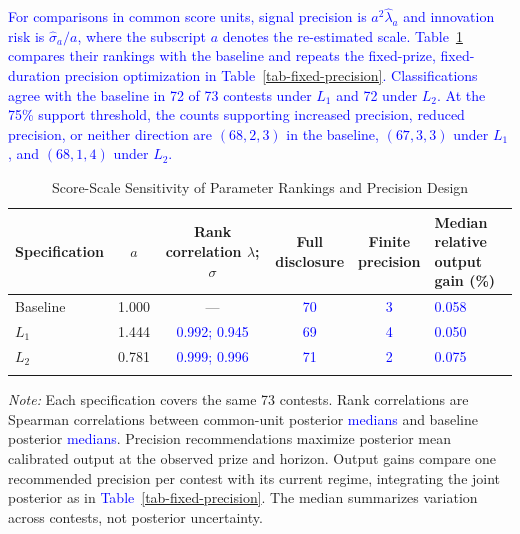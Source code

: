 \documentclass[mnsc]{informs3}
\begin{document}
\begin{APPENDICES}
\textcolor{blue}{For comparisons in common score units, signal precision is $a^2\hat\lambda_a$ and innovation risk is $\hat\sigma_a/a$, where the subscript $a$ denotes the re-estimated scale. Table~\ref{tab-score-scale-robustness} compares their rankings with the baseline and repeats the \textcolor{blue}{fixed-prize, fixed-duration precision optimization in Table~\ref{tab-fixed-precision}}. Classifications agree with the baseline in 72 of 73 contests under $L_1$ and 72 under $L_2$. At the 75\% support threshold, the counts supporting increased precision, reduced precision, or neither direction are $(68,2,3)$ in the baseline, $(67,3,3)$ under $L_1$, and $(68,1,4)$ under $L_2$.}

\begin{table}[htbp]
\centering
\caption{{Score-Scale Sensitivity of Parameter Rankings and Precision Design}}
\label{tab-score-scale-robustness}
{\small
\begin{tabularx}{\textwidth}{lcccc>{\centering\arraybackslash}X}
\toprule
Specification & $a$ & \makecell{Rank correlation\\$\lambda$; $\sigma$}
& \makecell{Full\\disclosure} & \makecell{Finite\\precision}
& \makecell{Median relative\\output gain (\%)}\\
\midrule
Baseline & 1.000 & --- & \textcolor{blue}{70} & \textcolor{blue}{3} & \textcolor{blue}{0.058}\\
$L_1$ & 1.444 & \textcolor{blue}{0.992; 0.945} & \textcolor{blue}{69} & \textcolor{blue}{4} & \textcolor{blue}{0.050}\\
$L_2$ & 0.781 & \textcolor{blue}{0.999; 0.996} & \textcolor{blue}{71} & \textcolor{blue}{2} & \textcolor{blue}{0.075}\\
\bottomrule
\addlinespace[0.5ex]
\end{tabularx}}
\begin{minipage}{\textwidth}
{\footnotesize\textit{Note:} Each specification covers the same 73 contests. Rank correlations are Spearman correlations between common-unit posterior \textcolor{blue}{medians} and baseline posterior \textcolor{blue}{medians}. Precision recommendations maximize posterior mean calibrated output at the observed prize and horizon. Output gains compare one recommended precision per contest with its current regime, integrating the joint posterior as in \textcolor{blue}{Table~\ref{tab-fixed-precision}}. The median summarizes variation across contests, not posterior uncertainty.}
\end{minipage}
\end{table}
\FloatBarrier


\end{APPENDICES}
\end{document}
